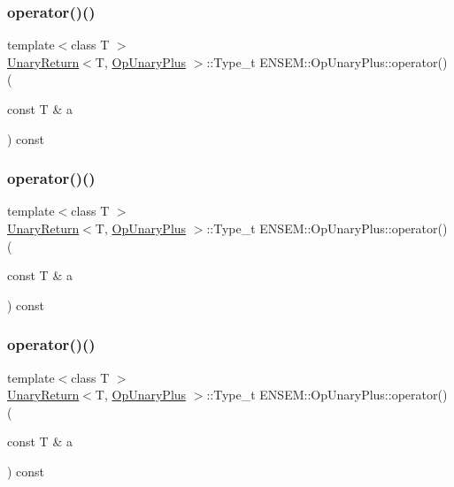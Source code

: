 \subsubsection{\texorpdfstring{operator()()}{operator()()}\hspace{0.1cm}{\footnotesize\ttfamily [1/3]}}
{\footnotesize\ttfamily template$<$class T $>$ \\
\mbox{\hyperlink{structENSEM_1_1UnaryReturn}{Unary\+Return}}$<$T, \mbox{\hyperlink{structENSEM_1_1OpUnaryPlus}{Op\+Unary\+Plus}} $>$\+::Type\+\_\+t E\+N\+S\+E\+M\+::\+Op\+Unary\+Plus\+::operator() (\begin{DoxyParamCaption}\item[{const T \&}]{a }\end{DoxyParamCaption}) const\hspace{0.3cm}{\ttfamily [inline]}}

\mbox{\label{structENSEM_1_1OpUnaryPlus_a508ecfc90631234c54b97cb705b14bc5}} 
\subsubsection{\texorpdfstring{operator()()}{operator()()}\hspace{0.1cm}{\footnotesize\ttfamily [2/3]}}
{\footnotesize\ttfamily template$<$class T $>$ \\
\mbox{\hyperlink{structENSEM_1_1UnaryReturn}{Unary\+Return}}$<$T, \mbox{\hyperlink{structENSEM_1_1OpUnaryPlus}{Op\+Unary\+Plus}} $>$\+::Type\+\_\+t E\+N\+S\+E\+M\+::\+Op\+Unary\+Plus\+::operator() (\begin{DoxyParamCaption}\item[{const T \&}]{a }\end{DoxyParamCaption}) const\hspace{0.3cm}{\ttfamily [inline]}}

\mbox{\label{structENSEM_1_1OpUnaryPlus_a508ecfc90631234c54b97cb705b14bc5}} 
\subsubsection{\texorpdfstring{operator()()}{operator()()}\hspace{0.1cm}{\footnotesize\ttfamily [3/3]}}
{\footnotesize\ttfamily template$<$class T $>$ \\
\mbox{\hyperlink{structENSEM_1_1UnaryReturn}{Unary\+Return}}$<$T, \mbox{\hyperlink{structENSEM_1_1OpUnaryPlus}{Op\+Unary\+Plus}} $>$\+::Type\+\_\+t E\+N\+S\+E\+M\+::\+Op\+Unary\+Plus\+::operator() (\begin{DoxyParamCaption}\item[{const T \&}]{a }\end{DoxyParamCaption}) const\hspace{0.3cm}{\ttfamily [inline]}}



